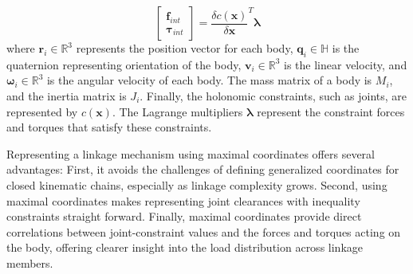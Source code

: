 \begin{equation}
    \begin{bmatrix}
    \textbf{f}_{int} \\
    \boldsymbol{\tau}_{int}
\end{bmatrix}  = \frac{\delta c(\textbf{x})}{\delta \textbf{x}}^T\boldsymbol{\lambda}
\end{equation}
where \(\textbf{r}_i \in {{\mathbb{R}}^3}\) represents the position vector for each body, \(\textbf{q}_i\in {{\mathbb{H}}}\) is the quaternion representing orientation of the body, \(\textbf{v}_i \in {{\mathbb{R}}^3}\) is the linear velocity, and \(\boldsymbol{\omega}_i \in {{\mathbb{R}}^3}\) is the angular velocity of each body. The mass matrix of a body is \(M_i\), and the inertia matrix is \(J_i\). Finally, the holonomic constraints, such as joints, are represented by $c(\textbf{x})$. The Lagrange multipliers $\boldsymbol{\lambda}$ represent the constraint forces and torques that satisfy these constraints. 

Representing a linkage mechanism using maximal coordinates offers several advantages: First, it avoids the challenges of defining generalized coordinates for closed kinematic chains, especially as linkage complexity grows. Second, using maximal coordinates makes representing joint clearances with inequality constraints straight forward. Finally, maximal coordinates provide direct correlations between joint-constraint values and the forces and torques acting on the body, offering clearer insight into the load distribution across linkage members. 

